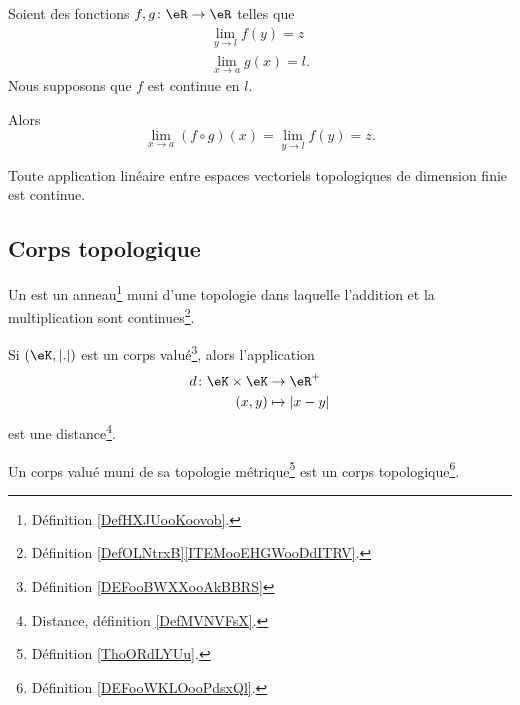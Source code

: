 \begin{proposition}       \label{PROPooKNVHooXlQyVA}
	Soient des fonctions \( f,g\colon \eR\to \eR\) telles que
	\begin{subequations}
		\begin{align}
			\lim_{y\to l} f(y)=z \\
			\lim_{x\to a} g(x)=l.
		\end{align}
	\end{subequations}
	Nous supposons que \( f\) est continue en \( l\).

	Alors
	\begin{equation}
		\lim_{x\to a} (f\circ g)(x)=\lim_{y\to l} f(y)=z.
	\end{equation}
\end{proposition}

\begin{proposition}     \label{PROPooBEHTooBrLWuh}
	Toute application linéaire entre espaces vectoriels topologiques de dimension finie est continue.
\end{proposition}

\subsection{Corps topologique}

\begin{definition}      \label{DEFooWKLOooPdsxQl}
	Un  est un anneau\footnote{Définition \ref{DefHXJUooKoovob}.} muni d'une topologie dans laquelle l'addition et la multiplication sont continues\footnote{Définition \ref{DefOLNtrxB}\ref{ITEMooEHGWooDdITRV}.}.
\end{definition}

\begin{propositionDef}      \label{PROPooAWAKooKRmbGT}
	Si \( (\eK, | . |)\) est un corps valué\footnote{Définition \ref{DEFooBWXXooAkBBRS}}, alors l'application
	\begin{equation}
		\begin{aligned}
			d\colon \eK\times \eK & \to \eR^+       \\
			(x,y)                 & \mapsto | x-y |
		\end{aligned}
	\end{equation}
	est une distance\footnote{Distance, définition \ref{DefMVNVFsX}.}.

	Un corps valué muni de sa topologie métrique\footnote{Définition \ref{ThoORdLYUu}.} est un corps topologique\footnote{Définition \ref{DEFooWKLOooPdsxQl}.}.
\end{propositionDef}

